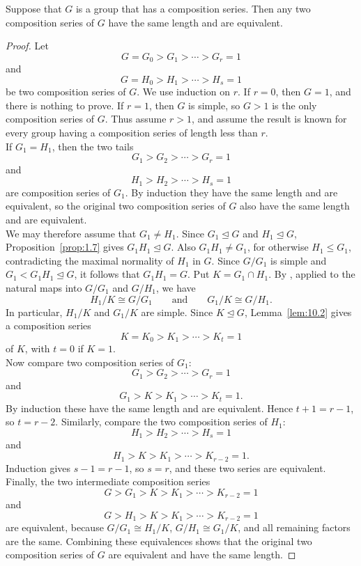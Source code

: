 \documentclass[../Odyssey_Project.tex]{subfiles}
\begin{document}
\begin{namedtheorem}
\label{thm:jordan-holder}
Suppose that $G$ is a group that has a composition series. Then any two composition series of $G$ have the same length and are equivalent.
\end{namedtheorem}
\begin{proof}
Let
\[
  G=G_0>G_1>\cdots>G_r=1
\]
and
\[
  G=H_0>H_1>\cdots>H_s=1
\]
be two composition series of $G$. We use induction on $r$. If $r=0$, then $G=1$, and there is nothing to prove. If $r=1$, then $G$ is simple, so $G>1$ is the only composition series of $G$. Thus assume $r>1$, and assume the result is known for every group having a composition series of length less than $r$.\\
If $G_1=H_1$, then the two tails
\[
  G_1>G_2>\cdots>G_r=1
\]
and
\[
  H_1>H_2>\cdots>H_s=1
\]
are composition series of $G_1$. By induction they have the same length and are equivalent, so the original two composition series of $G$ also have the same length and are equivalent.\\
We may therefore assume that $G_1\neq H_1$. Since $G_1\trianglelefteq G$ and $H_1\trianglelefteq G$, Proposition~\ref{prop:1.7} gives $G_1H_1\trianglelefteq G$. Also $G_1H_1\neq G_1$, for otherwise $H_1\leq G_1$, contradicting the maximal normality of $H_1$ in $G$. Since $G/G_1$ is simple and $G_1<G_1H_1\trianglelefteq G$, it follows that $G_1H_1=G$. Put $K=G_1\cap H_1$. By , applied to the natural maps into $G/G_1$ and $G/H_1$, we have
\[
  H_1/K\cong G/G_1
  \qquad\text{and}\qquad
  G_1/K\cong G/H_1.
\]
In particular, $H_1/K$ and $G_1/K$ are simple. Since $K\trianglelefteq G$, Lemma~\ref{lem:10.2} gives a composition series
\[
  K=K_0>K_1>\cdots>K_t=1
\]
of $K$, with $t=0$ if $K=1$.\\
Now compare two composition series of $G_1$:
\[
  G_1>G_2>\cdots>G_r=1
\]
and
\[
  G_1>K>K_1>\cdots>K_t=1.
\]
By induction these have the same length and are equivalent. Hence $t+1=r-1$, so $t=r-2$. Similarly, compare the two composition series of $H_1$:
\[
  H_1>H_2>\cdots>H_s=1
\]
and
\[
  H_1>K>K_1>\cdots>K_{r-2}=1.
\]
Induction gives $s-1=r-1$, so $s=r$, and these two series are equivalent. Finally, the two intermediate composition series
\[
  G>G_1>K>K_1>\cdots>K_{r-2}=1
\]
and
\[
  G>H_1>K>K_1>\cdots>K_{r-2}=1
\]
are equivalent, because $G/G_1\cong H_1/K$, $G/H_1\cong G_1/K$, and all remaining factors are the same. Combining these equivalences shows that the original two composition series of $G$ are equivalent and have the same length.
\end{proof}
\end{document}
